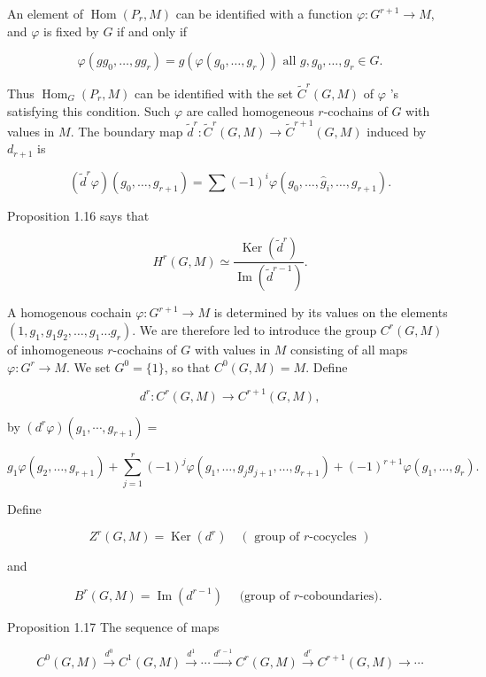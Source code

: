 \documentclass[10pt]{article}
\begin{document}
An element of $\operatorname{Hom}\left(P_{r}, M\right)$ can be identified with a function $\varphi: G^{r+1} \rightarrow M$, and $\varphi$ is fixed by $G$ if and only if

$$
\varphi\left(g g_{0}, \ldots, g g_{r}\right)=g\left(\varphi\left(g_{0}, \ldots, g_{r}\right)\right) \text { all } g, g_{0}, \ldots, g_{r} \in G .
$$

Thus $\operatorname{Hom}_{G}\left(P_{r}, M\right)$ can be identified with the set $\tilde{C}^{r}(G, M)$ of $\varphi$ 's satisfying this condition. Such $\varphi$ are called homogeneous $r$-cochains of $G$ with values in $M$. The boundary map $\tilde{d}^{r}: \tilde{C}^{r}(G, M) \rightarrow \tilde{C}^{r+1}(G, M)$ induced by $d_{r+1}$ is

$$
\left(\tilde{d}^{r} \varphi\right)\left(g_{0}, \ldots, g_{r+1}\right)=\sum(-1)^{i} \varphi\left(g_{0}, \ldots, \hat{g}_{i}, \ldots, g_{r+1}\right) .
$$

Proposition 1.16 says that

$$
H^{r}(G, M) \simeq \frac{\operatorname{Ker}\left(\tilde{d}^{r}\right)}{\operatorname{Im}\left(\tilde{d}^{r-1}\right)} .
$$

A homogenous cochain $\varphi: G^{r+1} \rightarrow M$ is determined by its values on the elements $\left(1, g_{1}, g_{1} g_{2}, \ldots, g_{1} \ldots g_{r}\right)$. We are therefore led to introduce the group $C^{r}(G, M)$ of inhomogeneous $r$-cochains of $G$ with values in $M$ consisting of all maps $\varphi: G^{r} \rightarrow M$. We set $G^{0}=\{1\}$, so that $C^{0}(G, M)=M$. Define

$$
d^{r}: C^{r}(G, M) \rightarrow C^{r+1}(G, M),
$$

by $\left(d^{r} \varphi\right)\left(g_{1}, \cdots, g_{r+1}\right)=$

$$
g_{1} \varphi\left(g_{2}, \ldots, g_{r+1}\right)+\sum_{j=1}^{r}(-1)^{j} \varphi\left(g_{1}, \ldots, g_{j} g_{j+1}, \ldots, g_{r+1}\right)+(-1)^{r+1} \varphi\left(g_{1}, \ldots, g_{r}\right) .
$$

Define

$$
Z^{r}(G, M)=\operatorname{Ker}\left(d^{r}\right) \quad(\text { group of } r \text {-cocycles })
$$

and

$$
B^{r}(G, M)=\operatorname{Im}\left(d^{r-1}\right) \quad \text { (group of } r \text {-coboundaries). }
$$

Proposition 1.17 The sequence of maps

$$
C^{0}(G, M) \xrightarrow{d^{0}} C^{1}(G, M) \xrightarrow{d^{1}} \cdots \xrightarrow{d^{r-1}} C^{r}(G, M) \xrightarrow{d^{r}} C^{r+1}(G, M) \rightarrow \cdots
$$
\end{document}
